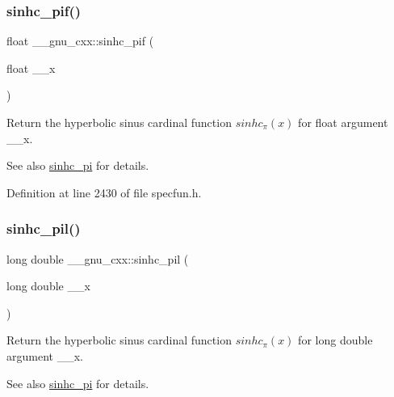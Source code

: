 \subsubsection{\texorpdfstring{sinhc\+\_\+pif()}{sinhc\_pif()}}
{\footnotesize\ttfamily float \+\_\+\+\_\+gnu\+\_\+cxx\+::sinhc\+\_\+pif (\begin{DoxyParamCaption}\item[{float}]{\+\_\+\+\_\+x }\end{DoxyParamCaption})\hspace{0.3cm}{\ttfamily [inline]}}

Return the hyperbolic sinus cardinal function $ sinhc_\pi(x) $ for {\ttfamily float} argument {\ttfamily \+\_\+\+\_\+x}.

\begin{DoxySeeAlso}{See also}
\hyperlink{group__gnu__math__spec__func_ga8bb6034e28d48879845bf64818cc06e1}{sinhc\+\_\+pi} for details. 
\end{DoxySeeAlso}


Definition at line 2430 of file specfun.\+h.

\mbox{\label{group__gnu__math__spec__func_gaa572bf7633f457c86cef65bfd6ec4ad9}} 
\subsubsection{\texorpdfstring{sinhc\+\_\+pil()}{sinhc\_pil()}}
{\footnotesize\ttfamily long double \+\_\+\+\_\+gnu\+\_\+cxx\+::sinhc\+\_\+pil (\begin{DoxyParamCaption}\item[{long double}]{\+\_\+\+\_\+x }\end{DoxyParamCaption})\hspace{0.3cm}{\ttfamily [inline]}}

Return the hyperbolic sinus cardinal function $ sinhc_\pi(x) $ for {\ttfamily long double} argument {\ttfamily \+\_\+\+\_\+x}.

\begin{DoxySeeAlso}{See also}
\hyperlink{group__gnu__math__spec__func_ga8bb6034e28d48879845bf64818cc06e1}{sinhc\+\_\+pi} for details. 
\end{DoxySeeAlso}


